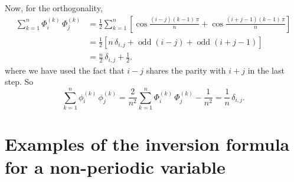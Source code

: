 \documentclass[reprint, floatfix]{revtex4-1}
\begin{document}
{  Now, for the orthogonality,
  $$
  \begin{aligned}
    \sum_{k = 1}^n
    \Phi^{(k)}_i \, \Phi^{(k)}_j
    &=
    \frac 1 2
    \sum_{k = 1}^n
    \left[
      \cos \tfrac{ (i - j) (k - 1) \, \pi }
                 {         n              }
      +
      \cos \tfrac{ (i + j - 1) (k - 1) \, \pi }
                 {             n              }
    \right]
    \\
    &=
    \frac 1 2
    \left[
      n \, \delta_{i, j}
      +
      \operatorname{odd}(i - j)
      +
      \operatorname{odd}(i + j - 1)
    \right]
    \\
    &=
    \frac n 2 \, \delta_{i, j}
    + \frac 1 2.
  \end{aligned}
  $$
  where we have used the fact
  that $i - j$ shares the parity with $i + j$
  in the last step.
  So
  $$
    \sum_{k = 1}^n
    \phi^{(k)}_i \, \phi^{(k)}_j
    =
    \frac 2 { n^2 }
    \sum_{k = 1}^n
    \Phi^{(k)}_i \, \Phi^{(k)}_j
    -
    \frac 1 { n^2 }
    =
    \frac 1 n \,
    \delta_{i, j}.
  $$
}
%


\section{Examples of the inversion formula
for a non-periodic variable}
\end{document}
